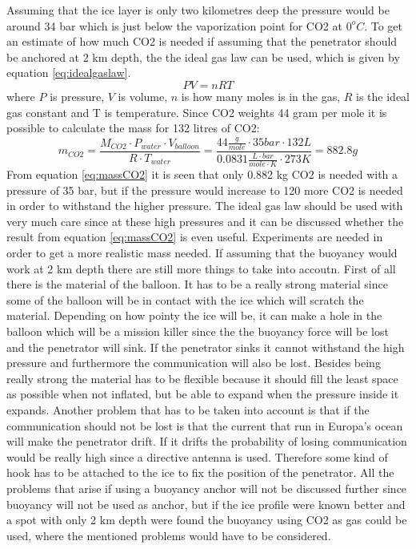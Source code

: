\noindent
Assuming that the ice layer is only two kilometres deep the pressure would be around 34 bar which is just below the vaporization point for CO2 at $0^oC$. To get an estimate of how much CO2 is needed if assuming that the penetrator should be anchored at 2 km depth, the the ideal gas law can be used, which is given by equation \ref{eq:idealgaslaw}. 
\begin{equation} \label{eq:idealgaslaw}
PV = nRT
\end{equation}
where $P$ is pressure, $V$ is volume, $n$ is how many moles is in the gas, $R$ is the ideal gas constant and T is temperature. Since CO2 weights 44 gram per mole it is possible to calculate the mass for 132 litres of CO2: 
\begin{equation}\label{eq:massCO2}
m_{CO2} = \frac{M_{CO2} \cdot P_{water}\cdot V_{balloon}}{R\cdot T_{water}} = \frac{44 \frac{g}{mole} \cdot 35 bar \cdot 132 L}{0.0831  \frac{L\cdot bar}{mole \cdot K} \cdot 273K} = 882.8 g
\end{equation}
From equation \ref{eq:massCO2} it is seen that only 0.882 kg CO2 is needed with a pressure of 35 bar, but if the pressure would increase to 120 more CO2 is needed in order to withstand the higher pressure. The ideal gas law should be used with very much care since at these high pressures and it can be discussed whether the result from equation \ref{eq:massCO2} is even useful. Experiments are needed in order to get a more realistic mass needed. If assuming that the buoyancy would work at 2 km depth there are still more things to take into accoutn. First of all there is the material of the balloon. It has to be a really strong material since some of the balloon will be in contact with the ice which will scratch the material. Depending on how pointy the ice will be, it can make a hole in the balloon which will be a mission killer since the the buoyancy force will be lost and the penetrator will sink. If the penetrator sinks it cannot withstand the high pressure and furthermore the communication will also be lost. Besides being really strong the material has to be flexible because it should fill the least space as possible when not inflated, but be able to expand when the pressure inside it expands. Another problem that has to be taken into account is that if the communication should not be lost is that the current that run in Europa's ocean will make the penetrator drift. If it drifts the probability of losing communication would be really high since a directive antenna is used.  Therefore some kind of hook has to be attached to the ice to fix the position of the penetrator. All the problems that arise if using a buoyancy anchor will not be discussed further since buoyancy will not be used as anchor, but if the ice profile were known better and a spot with only 2 km depth were found the buoyancy using CO2 as gas could be used, where the mentioned problems would have to be considered. \\

